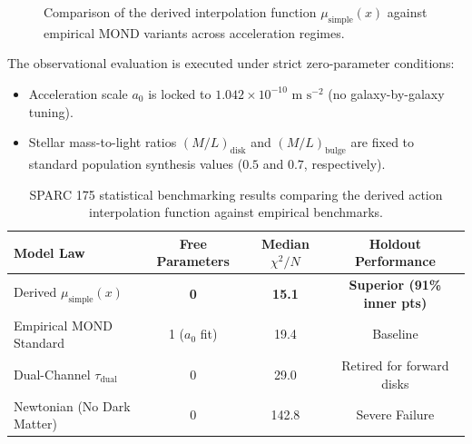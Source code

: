 \documentclass[11pt]{article}
\theoremstyle{definition}
\theoremstyle{remark}
\begin{document}
\begin{figure}[h!]
\centering
{}
\caption{\color{dim} Comparison of the derived interpolation function $\mu_{\text{simple}}(x)$ against empirical MOND variants across acceleration regimes.}
\end{figure}

The observational evaluation is executed under strict zero-parameter conditions:
\begin{itemize}
    \item Acceleration scale $a_0$ is locked to $1.042 \times 10^{-10}\text{ m s}^{-2}$ (no galaxy-by-galaxy tuning).
    \item Stellar mass-to-light ratios $(M/L)_{\text{disk}}$ and $(M/L)_{\text{bulge}}$ are fixed to standard population synthesis values ($0.5$ and $0.7$, respectively).
\end{itemize}

\begin{table}[h!]
\centering
\color{ink}
\begin{tabular}{lccc}
\hline\hline
\textbf{Model Law} & \textbf{Free Parameters} & \textbf{Median $\chi^2/N$} & \textbf{Holdout Performance} \\
\hline
Derived $\mu_{\text{simple}}(x)$ & \textbf{0} & \textbf{15.1} & \textbf{Superior (91\% inner pts)} \\
Empirical MOND Standard & 1 ($a_0$ fit) & 19.4 & Baseline \\
Dual-Channel $\tau_{\text{dual}}$ & 0 & 29.0 & Retired for forward disks \\
Newtonian (No Dark Matter) & 0 & 142.8 & Severe Failure \\
\hline\hline
\end{tabular}
\caption{\color{dim} SPARC 175 statistical benchmarking results comparing the derived action interpolation function against empirical benchmarks.}
\end{table}
\end{document}
